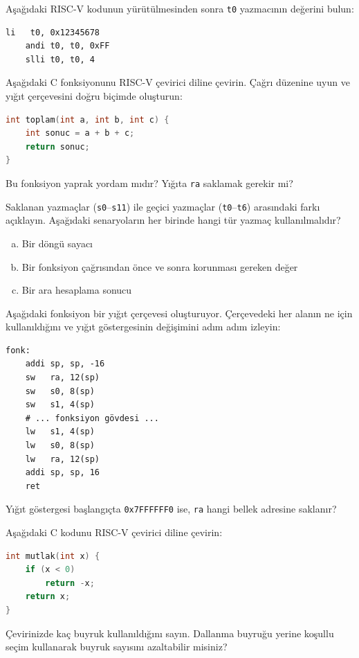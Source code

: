 \begin{alistirma}[\kolay]
Aşağıdaki RISC-V kodunun yürütülmesinden sonra \texttt{t0} yazmacının değerini bulun:
\begin{lstlisting}[style=riscv]
    li   t0, 0x12345678
    andi t0, t0, 0xFF
    slli t0, t0, 4
\end{lstlisting}
\end{alistirma}

\begin{alistirma}[\orta]
Aşağıdaki C fonksiyonunu RISC-V çevirici diline çevirin. Çağrı düzenine uyun ve yığıt çerçevesini doğru biçimde oluşturun:
\begin{lstlisting}[language=C, style=alistirma-kod]
int toplam(int a, int b, int c) {
    int sonuc = a + b + c;
    return sonuc;
}
\end{lstlisting}
Bu fonksiyon yaprak yordam mıdır? Yığıta \texttt{ra} saklamak gerekir mi?
\end{alistirma}

\begin{alistirma}[\orta]
Saklanan yazmaçlar (\texttt{s0}--\texttt{s11}) ile geçici yazmaçlar (\texttt{t0}--\texttt{t6}) arasındaki farkı açıklayın. Aşağıdaki senaryoların her birinde hangi tür yazmaç kullanılmalıdır?
\begin{enumerate}[(a)]
\item Bir döngü sayacı
\item Bir fonksiyon çağrısından önce ve sonra korunması gereken değer
\item Bir ara hesaplama sonucu
\end{enumerate}
\end{alistirma}

\begin{alistirma}[\orta]
Aşağıdaki fonksiyon bir yığıt çerçevesi oluşturuyor. Çerçevedeki her alanın ne için kullanıldığını ve yığıt göstergesinin değişimini adım adım izleyin:
\begin{lstlisting}[style=riscv]
fonk:
    addi sp, sp, -16
    sw   ra, 12(sp)
    sw   s0, 8(sp)
    sw   s1, 4(sp)
    # ... fonksiyon gövdesi ...
    lw   s1, 4(sp)
    lw   s0, 8(sp)
    lw   ra, 12(sp)
    addi sp, sp, 16
    ret
\end{lstlisting}
Yığıt göstergesi başlangıçta \texttt{0x7FFFFFF0} ise, \texttt{ra} hangi bellek adresine saklanır?
\end{alistirma}

\begin{alistirma}[\orta]
Aşağıdaki C kodunu RISC-V çevirici diline çevirin:
\begin{lstlisting}[language=C, style=alistirma-kod]
int mutlak(int x) {
    if (x < 0)
        return -x;
    return x;
}
\end{lstlisting}
Çevirinizde kaç buyruk kullanıldığını sayın. Dallanma buyruğu yerine koşullu seçim kullanarak buyruk sayısını azaltabilir misiniz?
\end{alistirma}

